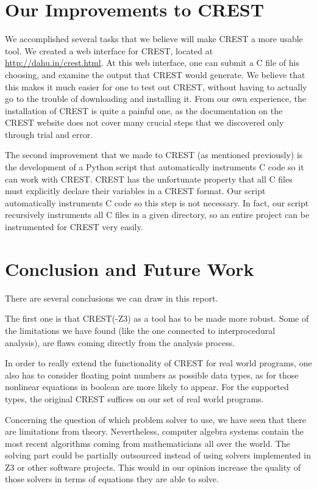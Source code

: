 \documentclass[oribibl]{llncs}
\begin{document}
\section{Our Improvements to CREST}
\label{sctn:Improvements}
We accomplished several tasks that we believe will make CREST a more usable tool. We created a web interface for CREST, located at \url{http://dahu.in/crest.html}. At this web interface, one can submit a C file of his choosing, and examine the output that CREST would generate. We believe that this makes it much easier for one to test out CREST, without having to actually go to the trouble of downloading and installing it. From our own experience, the installation of CREST is quite a painful one, as the documentation on the CREST website does not cover many crucial steps that we discovered only through trial and error.

The second improvement that we made to CREST (as mentioned previously) is the development of a Python script that automatically instruments C code so it can work with CREST. CREST has the unfortunate property that all C files must explicitly declare their variables in a CREST format. Our script automatically instruments C code so this step is not necessary. In fact, our script recursively instruments all C files in a given directory, so an entire project can be instrumented for CREST very easily.


\section{Conclusion and Future Work}
\label{sctn:Conclusion}

There are several conclusions we can draw in this report.

The first one is that \textsc{CREST(-Z3)} as a tool has to be made more robust. Some of the limitations we have found (like the one connected to interprocedural analysis), are flaws coming directly from the analysis process.

In order to really extend the functionality of \textsc{CREST} for real world programs, one also has to consider floating point numbers as possible data types, as for those nonlinear equations in boolean are more likely to appear. For the supported types, the original \textsc{CREST} suffices on our set of real world programs.

Concerning the question of which problem solver to use, we have seen that there are limitations from theory. Nevertheless, computer algebra systems contain the most recent algorithms coming from mathematicians all over the world. The solving part could be partially outsourced instead of using solvers implemented in \textsc{Z3} or other software projects. This would in our opinion increase the quality of those solvers in terms of equations they are able to solve.
\end{document}
